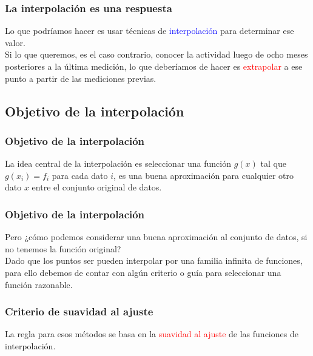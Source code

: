 \documentclass[12pt]{beamer}
\begin{document}
\begin{frame}
\frametitle{La interpolación es una respuesta}
Lo que podríamos hacer es usar técnicas de \textcolor{blue}{interpolación} para determinar ese valor.  
\\
\bigskip
\pause
Si lo que queremos, es el caso contrario, conocer la actividad luego de ocho meses posteriores a la última medición, lo que deberíamos de hacer es \textcolor{red}{extrapolar} a ese punto a partir de las mediciones previas.
\end{frame}

\subsection{Objetivo de la interpolación}

\begin{frame}
\frametitle{Objetivo de la interpolación}
La idea central de la interpolación es seleccionar una función $g (x)$ tal que $g (x_{i}) = f_{i}$ para cada dato $i$, es una buena aproximación para cualquier otro dato $x$ entre el conjunto original de datos.
\end{frame}
\begin{frame}
\frametitle{Objetivo de la interpolación}
Pero ¿cómo podemos considerar una buena aproximación al conjunto de datos, si no tenemos la función original?
\\
\bigskip
\pause
Dado que los puntos ser pueden interpolar por una familia infinita de funciones, para ello debemos de contar con algún criterio o guía para seleccionar una función razonable.
\end{frame}
\begin{frame}
\frametitle{Criterio de suavidad al ajuste}
La regla para esos métodos se basa en la \textcolor{red}{suavidad al ajuste} de las funciones de interpolación.
\end{frame}
\end{document}
